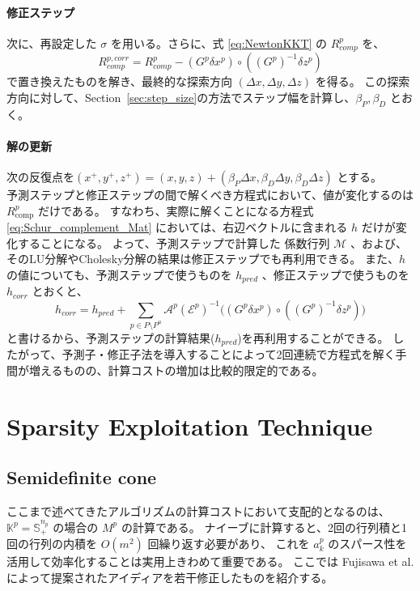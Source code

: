 \documentclass{jsarticle}
\begin{document}
\paragraph{修正ステップ} 次に、再設定した $\sigma$ を用いる。さらに、式 \eqref{eq:NewtonKKT} の $R^p_{comp}$ を、
\[R^{p, corr}_{comp}=R^p_{comp}-(G^p \delta x^p)\circ((G^p)^{-1} \delta z^p)\]
で置き換えたものを解き、最終的な探索方向 $(\Delta x, \Delta y, \Delta z)$ を得る。
この探索方向に対して、Section~\ref{sec:step_size}の方法でステップ幅を計算し、$\beta_P, \beta_D$ とおく。

\paragraph{解の更新} 次の反復点を$(x^+, y^+, z^+) = (x, y, z) + (\beta_P \Delta x, \beta_D \Delta y, \beta_D \Delta z)$ とする。
\\



予測ステップと修正ステップの間で解くべき方程式において、値が変化するのは $R^p_{\mathrm{comp}}$ だけである。
すなわち、実際に解くことになる方程式 \eqref{eq:Schur_complement_Mat} においては、右辺ベクトルに含まれる $h$ だけが変化することになる。
よって、予測ステップで計算した 係数行列 $\mathcal{M}$ 、および、そのLU分解やCholesky分解の結果は修正ステップでも再利用できる。
また、$h$の値についても、予測ステップで使うものを $h_{pred}$ 、修正ステップで使うものを $h_{corr}$ とおくと、
\[h_{corr}=h_{pred} + \sum_{p\in P\setminus P^u} \mathcal{A}^p (\mathcal{E}^p)^{-1} \big((G^p \delta x^p) \circ ((G^p)^{-1} \delta z^p) \big)\] 
と書けるから、予測ステップの計算結果($h_{pred}$)を再利用することができる。
したがって、予測子・修正子法を導入することによって2回連続で方程式を解く手間が増えるものの、計算コストの増加は比較的限定的である。


\medskip
\section{Sparsity Exploitation Technique} \label{sec:exploit_sparsity}
\subsection{Semidefinite cone} \label{sec:exploit_sparsity_sdp}
ここまで述べてきたアルゴリズムの計算コストにおいて支配的となるのは、$\mathbb{K}^p=\mathbb{S}^{n_p}_+$ の場合の $M^p$ の計算である。
ナイーブに計算すると、2回の行列積と1回の行列の内積を $O(m^2)$ 回繰り返す必要があり、
これを $a^p_k$ のスパース性を活用して効率化することは実用上きわめて重要である。
ここでは Fujisawa et al.\cite{Fujisawa1997} によって提案されたアイディアを若干修正したものを紹介する。
\end{document}
